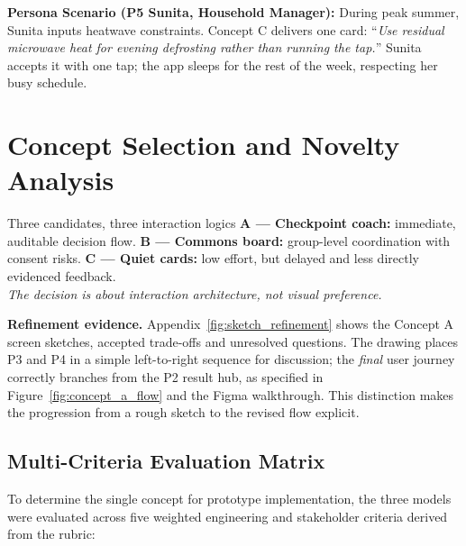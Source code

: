 \documentclass[12pt,a4paper]{article}
\begin{document}
\textbf{Persona Scenario (P5 Sunita, Household Manager):} During peak summer, Sunita inputs heatwave constraints. Concept C delivers one card: ``\emph{Use residual microwave heat for evening defrosting rather than running the tap.}'' Sunita accepts it with one tap; the app sleeps for the rest of the week, respecting her busy schedule.

\clearpage
\section{Concept Selection and Novelty Analysis}

\begin{chapterfocus}{Three candidates, three interaction logics}
\textbf{A --- Checkpoint coach:} immediate, auditable decision flow. \quad
\textbf{B --- Commons board:} group-level coordination with consent risks. \quad
\textbf{C --- Quiet cards:} low effort, but delayed and less directly evidenced feedback.\\[0.3em]
\textit{The decision is about interaction architecture, not visual preference.}
\end{chapterfocus}

\begin{keybox}
\textbf{Refinement evidence.} Appendix~\ref{fig:sketch_refinement} shows the Concept A screen sketches, accepted trade-offs and unresolved questions. The drawing places P3 and P4 in a simple left-to-right sequence for discussion; the \emph{final} user journey correctly branches from the P2 result hub, as specified in Figure~\ref{fig:concept_a_flow} and the Figma walkthrough. This distinction makes the progression from a rough sketch to the revised flow explicit.
\end{keybox}

\subsection{Multi-Criteria Evaluation Matrix}
To determine the single concept for prototype implementation, the three models were evaluated across five weighted engineering and stakeholder criteria derived from the rubric:
\end{document}
